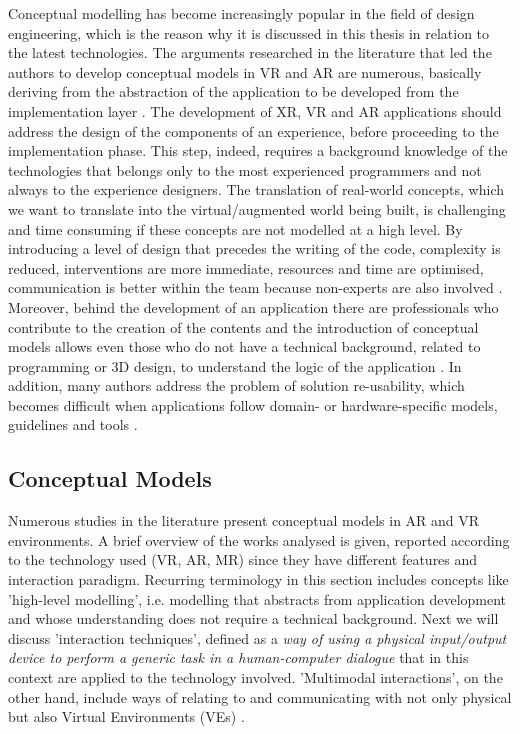 Conceptual modelling has become increasingly popular in the field of design engineering, which is the reason why it is discussed in this thesis in relation to the latest technologies. 
The arguments researched in the literature that led the authors to develop conceptual models in VR and AR are numerous, basically deriving from the abstraction of the application to be developed from the implementation layer \cite{de_troyer_conceptual_2007}. The development of XR, VR and AR applications should address the design of the components of an experience, before proceeding to the implementation phase. This step, indeed, requires a background knowledge of the technologies that belongs only to the most experienced programmers and not always to the experience designers. 
The translation of real-world concepts, which we want to translate into the virtual/augmented world being built, is challenging and time consuming if these concepts are not modelled at a high level. By introducing a level of design that precedes the writing of the code, complexity is reduced, interventions are more immediate, resources and time are optimised, communication is better within the team because non-experts are also involved \cite{coninx_vr-demo_2006}. 
Moreover, behind the development of an application there are professionals who contribute to the creation of the contents and the introduction of conceptual models allows even those who do not have a technical background, related to programming or 3D design, to understand the logic of the application \cite{walczak_structured_2008}. 
In addition, many authors address the problem of solution re-usability, which becomes difficult when applications follow domain- or hardware-specific models, guidelines and tools \cite{figueroa_conceptual_2006}. 

\subsection{Conceptual Models}

Numerous studies in the literature present conceptual models in AR and VR environments. A brief overview of the works analysed is given, reported according to the technology used (VR, AR, MR) since they have different features and interaction paradigm.
Recurring terminology in this section includes concepts like 'high-level modelling', i.e. modelling that abstracts from application development and whose understanding does not require a technical background. Next we will discuss 'interaction techniques', defined as a \textit{way of using a physical input/output device to perform a generic task in a human-computer dialogue} \cite{foley_computer_1990} that in this context are applied to the technology involved. 'Multimodal interactions', on the other hand, include ways of relating to and communicating with not only physical but also Virtual Environments (VEs) \cite{bourguet_designing_2003}. 

